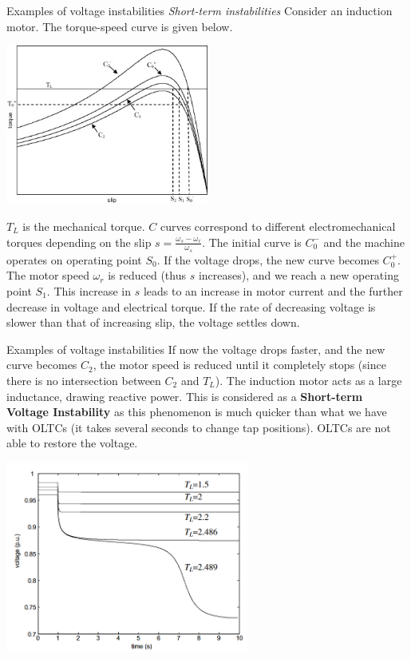 \begin{frame} {Examples of voltage instabilities}
\emph{Short-term instabilities}
Consider an induction motor. The torque-speed curve is given below.
\begin{center}
\includegraphics[width=0.5\textwidth]{images/Motorstalling.png}
\end{center}
$T_L$ is the mechanical torque. $C$ curves correspond to different electromechanical torques depending on the slip $s=\frac{\omega_s - \omega_r}{\omega_s}$.
The initial curve is $C_0^-$ and the machine operates on operating point $S_0$. If the voltage drops, the new curve becomes $C_0^+$.
The motor speed $\omega_r$ is reduced (thus $s$ increases), and we reach a new operating point $S_1$. This increase in $s$ leads to an increase in motor current and the further decrease in voltage and electrical torque. If the rate of decreasing voltage is slower than that of increasing slip, the voltage settles down.
\end{frame}

\begin{frame} {Examples of voltage instabilities}
If now the voltage drops faster, and the new curve becomes $C_2$, the motor speed is reduced until it completely stops (since there is no intersection between $C_2$ and $T_L$). The induction motor acts as a large inductance, drawing reactive power.
This is considered as a \textbf{Short-term Voltage Instability} as this phenomenon is much quicker than what we have with OLTCs (it takes several seconds to change tap positions). OLTCs are not able to restore the voltage.
\begin{center}
\includegraphics[width=0.6\textwidth]{images/InductionMotorVoltage.png}
\end{center}
\end{frame}

